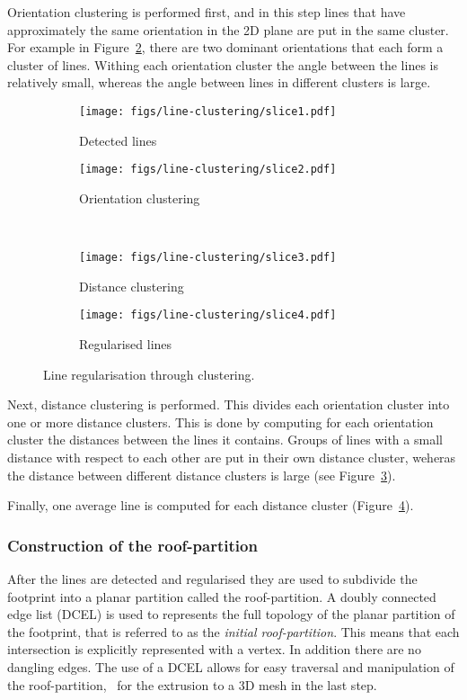Orientation clustering is performed first, and in this step lines that have approximately the same orientation in the 2D plane are put in the same cluster. For example in Figure~\ref{fig:lineclust:2}, there are two dominant orientations that each form a cluster of lines. Withing each orientation cluster the angle between the lines is relatively small, whereas the angle between lines in different clusters is large.
\begin{figure}
	\centering
	\begin{subfigure}[b]{0.48\linewidth}
		\texttt{[image: figs/line-clustering/slice1.pdf]}
		\caption{Detected lines}%
		\label{fig:lineclust:1}
	\end{subfigure}
	\quad
 	\begin{subfigure}[b]{0.48\linewidth}
		\texttt{[image: figs/line-clustering/slice2.pdf]}
		\caption{Orientation clustering}%
		\label{fig:lineclust:2}
	\end{subfigure}
\\
	\begin{subfigure}[b]{0.48\linewidth}
		\texttt{[image: figs/line-clustering/slice3.pdf]}
		\caption{Distance clustering}%
		\label{fig:lineclust:3}
	\end{subfigure}
\quad
	\begin{subfigure}[b]{0.48\linewidth}
		\texttt{[image: figs/line-clustering/slice4.pdf]}
		\caption{Regularised lines}%
		\label{fig:lineclust:4}
	\end{subfigure}	
	\caption{Line regularisation through clustering. }%
	\label{fig:lineclust}
\end{figure}

Next, distance clustering is performed.
This divides each orientation cluster into one or more distance clusters.
This is done by computing for each orientation cluster the distances between the lines it contains.
Groups of lines with a small distance with respect to each other are put in their own distance cluster, weheras the distance between different distance clusters is large (see Figure~\ref{fig:lineclust:3}).

Finally, one average line is computed for each distance cluster (Figure~\ref{fig:lineclust:4}).

\subsubsection{Construction of the roof-partition}
After the lines are detected and regularised they are used to subdivide the footprint into a planar partition called the roof-partition.
A doubly connected edge list (DCEL) is used to represents the full topology of the planar partition of the footprint, that is referred to as the \emph{initial roof-partition}.
This means that each intersection is explicitly represented with a vertex.
In addition there are no dangling edges.
The use of a DCEL allows for easy traversal and manipulation of the roof-partition, \eg\ for the extrusion to a 3D mesh in the last step.


